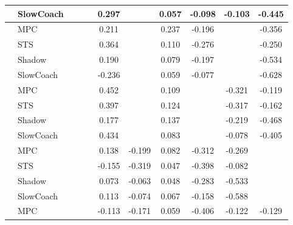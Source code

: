\begin{tabular}{|l|l|*{9}{c|}}
                                                           & SlowCoach &       &        &        &  0.297 &     &  0.057 &  -0.098 &  -0.103 &   -0.445 \\
\midrule
[False, False, False, True, False, True, True, False, True] & MPC &       &        &        &  0.211 &     &  0.237 &  -0.196 &      &   -0.356 \\
                                                           & STS &       &        &        &  0.364 &     &  0.110 &  -0.276 &      &   -0.250 \\
                                                           & Shadow &       &        &        &  0.190 &     &  0.079 &  -0.197 &      &   -0.534 \\
                                                           & SlowCoach &       &        &        & -0.236 &     &  0.059 &  -0.077 &      &   -0.628 \\
\midrule
[False, False, False, True, False, True, False, True, True] & MPC &       &        &        &  0.452 &     &  0.109 &      &  -0.321 &   -0.119 \\
                                                           & STS &       &        &        &  0.397 &     &  0.124 &      &  -0.317 &   -0.162 \\
                                                           & Shadow &       &        &        &  0.177 &     &  0.137 &      &  -0.219 &   -0.468 \\
                                                           & SlowCoach &       &        &        &  0.434 &     &  0.083 &      &  -0.078 &   -0.405 \\
\midrule
[False, False, False, True, True, True, True, True, False] & MPC &       &        &        &  0.138 & -0.199 &  0.082 &  -0.312 &  -0.269 &       \\
                                                           & STS &       &        &        & -0.155 & -0.319 &  0.047 &  -0.398 &  -0.082 &       \\
                                                           & Shadow &       &        &        &  0.073 & -0.063 &  0.048 &  -0.283 &  -0.533 &       \\
                                                           & SlowCoach &       &        &        &  0.113 & -0.074 &  0.067 &  -0.158 &  -0.588 &       \\
\midrule
[False, False, False, True, True, True, True, True, True] & MPC &       &        &        & -0.113 & -0.171 &  0.059 &  -0.406 &  -0.122 &   -0.129 \\

\end{tabular}
